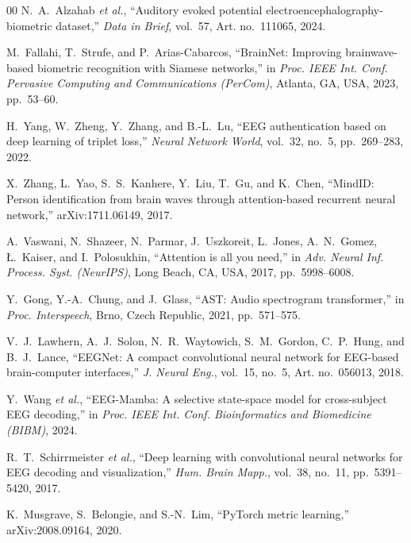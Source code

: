 \documentclass{IEEEtran}
\begin{document}
\begin{thebibliography}{00}
 N.~A.~Alzahab \emph{et al.}, ``Auditory evoked potential
electroencephalography-biometric dataset,'' \emph{Data in Brief},
vol.~57, Art. no.~111065, 2024.

 M.~Fallahi, T.~Strufe, and P.~Arias-Cabarcos, ``BrainNet:
Improving brainwave-based biometric recognition with Siamese networks,''
in \emph{Proc. IEEE Int. Conf. Pervasive Computing and Communications
(PerCom)}, Atlanta, GA, USA, 2023, pp.~53--60.

 H.~Yang, W.~Zheng, Y.~Zhang, and B.-L.~Lu, ``EEG
authentication based on deep learning of triplet loss,'' \emph{Neural
Network World}, vol.~32, no.~5, pp.~269--283, 2022.

 X.~Zhang, L.~Yao, S.~S.~Kanhere, Y.~Liu, T.~Gu, and
K.~Chen, ``MindID: Person identification from brain waves through
attention-based recurrent neural network,'' arXiv:1711.06149, 2017.

 A.~Vaswani, N.~Shazeer, N.~Parmar, J.~Uszkoreit, L.~Jones,
A.~N.~Gomez, {\L}.~Kaiser, and I.~Polosukhin, ``Attention is all you
need,'' in \emph{Adv. Neural Inf. Process. Syst. (NeurIPS)}, Long
Beach, CA, USA, 2017, pp.~5998--6008.

 Y.~Gong, Y.-A.~Chung, and J.~Glass, ``AST: Audio
spectrogram transformer,'' in \emph{Proc. Interspeech}, Brno, Czech
Republic, 2021, pp.~571--575.

 V.~J.~Lawhern, A.~J.~Solon, N.~R.~Waytowich, S.~M.~Gordon,
C.~P.~Hung, and B.~J.~Lance, ``EEGNet: A compact convolutional neural
network for EEG-based brain-computer interfaces,'' \emph{J. Neural
Eng.}, vol.~15, no.~5, Art. no.~056013, 2018.

 Y.~Wang \emph{et al.}, ``EEG-Mamba: A selective state-space
model for cross-subject EEG decoding,'' in \emph{Proc. IEEE Int. Conf.
Bioinformatics and Biomedicine (BIBM)}, 2024.

 R.~T.~Schirrmeister \emph{et al.}, ``Deep learning with
convolutional neural networks for EEG decoding and visualization,''
\emph{Hum. Brain Mapp.}, vol.~38, no.~11, pp.~5391--5420, 2017.

 K.~Musgrave, S.~Belongie, and S.-N.~Lim, ``PyTorch metric
learning,'' arXiv:2008.09164, 2020.
\end{thebibliography}
\end{document}
